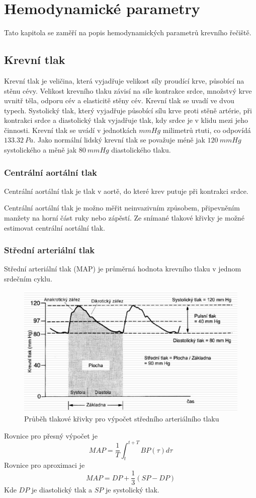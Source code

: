 \chapter{Hemodynamické parametry}
Tato kapitola se zaměří na popis hemodynamických parametrů krevního řečiště.
\section{Krevní tlak}
Krevní tlak je veličina, která vyjadřuje velikost síly proudící krve, působící na stěnu cévy. Velikost krevního tlaku závisí na síle kontrakce srdce, množstvý krve uvnitř těla,
odporu cév a elasticitě stěny cév. Krevní tlak se uvadí ve dvou typech. Systolický tlak, který vyjadřuje působící sílu krve proti stěně artérie, při kontrakci srdce a diastolický tlak vyjadřuje
tlak, kdy srdce je v klidu mezi jeho činnosti. Krevní tlak se uvádí v jednotkách $mmHg$ milimetrů rtuti, co odpovídá $133.32
    \  Pa$. Jako normální lidský krevní tlak se považuje méně jak $120 \ mmHg$ systolického a měně jak  $80 \ mmHg$ diastolického tlaku.
\subsection{Centrální aortální tlak}
Centrální aortální tlak je tlak v aortě, do které krev putuje při kontrakci srdce. \par
Centrální aortální tlak je možno měřit neinvazivním způsobem, připevněním manžety na horní část ruky nebo zápěstí. Ze snímané tlakové křivky je
možné estimovat centrální aortální tlak.

\subsection{Střední arteriální tlak}
Střední arteriální tlak (MAP) je průměrná hodnota krevního tlaku v jednom srdečním cyklu.
\begin{figure}[H]
    \caption{Průběh tlakové křivky pro výpočet středního arteriálního tlaku}
    \includegraphics[width=1\textwidth]{pictures/map.jpg}
\end{figure}
Rovnice pro přesný výpočet je
\begin{equation}
    MAP = \frac{1}{T} \int_{t}^{t + T} BP(\tau) d\tau
\end{equation}
Rovnice pro aproximaci je
\begin{equation}
    MAP = DP + \frac{1}{3}(SP - DP)
\end{equation}
Kde $DP$ je diastolický tlak a $SP$ je systolický tlak.
